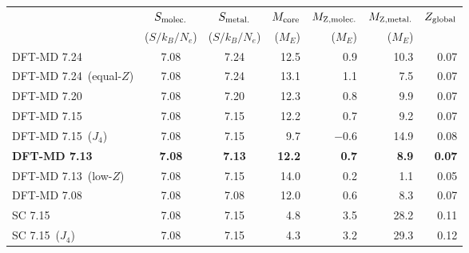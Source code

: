 \begin{table}
\begin{tabular}{l|cc|rrrr}
    \hline
    {} & {$S_{\rm molec.}$} &  {$S_{\rm metal.}$} & {$M_{\rm core}$} & {$M_{\rm Z,molec.}$}
    & {$M_{\rm Z,metal.}$} & {$Z_{\rm global}$} \\
    &  {($S/k_B/N_e$)} & {($S/k_B/N_e$)} & {($M_E$)} &  {($M_E$)} &  {($M_E$)} & \\
    \hline
    DFT-MD   7.24             &  7.08  &  7.24  &  12.5  &  0.9     &  10.3  &  0.07  \\
    DFT-MD  7.24~(equal-$Z$)  &  7.08  &  7.24  &  13.1  &  1.1     &  7.5   &  0.07  \\
    DFT-MD  7.20              &  7.08  &  7.20  &  12.3  &  0.8     &  9.9   &  0.07  \\
    DFT-MD  7.15              &  7.08  &  7.15  &  12.2  &  0.7     &  9.2   &  0.07  \\
    DFT-MD  7.15~($J_4$)      &  7.08  &  7.15  &  9.7   &  $-$0.6  &  14.9  &  0.08  \\
    {\bf DFT-MD 7.13}       & {\bf 7.08}   & {\bf 7.13} & {\bf 12.2}  & {\bf  0.7}   &
    {\bf 8.9}   &  {\bf 0.07}  \\
    DFT-MD  7.13~(low-$Z$)  &  7.08  &  7.15  &  14.0  &  0.2  &  1.1   &  0.05  \\
    DFT-MD  7.08            &  7.08  &  7.08  &  12.0  &  0.6  &  8.3   &  0.07  \\
    SC      7.15            &  7.08  &  7.15  &  4.8   &  3.5  &  28.2  &  0.11  \\
    SC      7.15~($J_4$)    &  7.08  &  7.15  &  4.3   &  3.2  &  29.3  &  0.12  \\
    \hline
\end{tabular}

\end{table}

